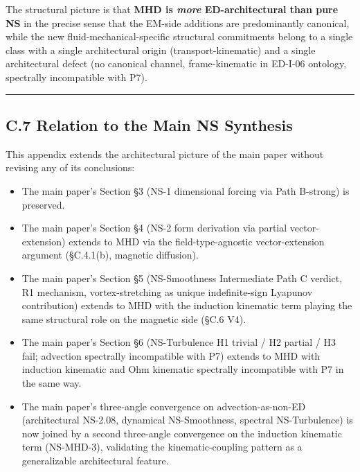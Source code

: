 \documentclass[
  11pt,a4paper]{article}
\providecommand{\tightlist}{%
  \setlength{\itemsep}{0pt}\setlength{\parskip}{0pt}}
\begin{document}
The structural picture is that \textbf{MHD is \emph{more}
ED-architectural than pure NS} in the precise sense that the EM-side
additions are predominantly canonical, while the new
fluid-mechanical-specific structural commitments belong to a single
class with a single architectural origin (transport-kinematic) and a
single architectural defect (no canonical channel, frame-kinematic in
ED-I-06 ontology, spectrally incompatible with P7).

\begin{center}\rule{0.5\linewidth}{0.5pt}\end{center}

\subsection{C.7 Relation to the Main NS
Synthesis}\label{c.7-relation-to-the-main-ns-synthesis}

This appendix extends the architectural picture of the main paper
without revising any of its conclusions:

\begin{itemize}
\tightlist
\item
  The main paper's Section §3 (NS-1 dimensional forcing via Path
  B-strong) is preserved.
\item
  The main paper's Section §4 (NS-2 form derivation via partial
  vector-extension) extends to MHD via the field-type-agnostic
  vector-extension argument (§C.4.1(b), magnetic diffusion).
\item
  The main paper's Section §5 (NS-Smoothness Intermediate Path C
  verdict, R1 mechanism, vortex-stretching as unique indefinite-sign
  Lyapunov contribution) extends to MHD with the induction kinematic
  term playing the same structural role on the magnetic side (§C.6 V4).
\item
  The main paper's Section §6 (NS-Turbulence H1 trivial / H2 partial /
  H3 fail; advection spectrally incompatible with P7) extends to MHD
  with induction kinematic and Ohm kinematic spectrally incompatible
  with P7 in the same way.
\item
  The main paper's three-angle convergence on advection-as-non-ED
  (architectural NS-2.08, dynamical NS-Smoothness, spectral
  NS-Turbulence) is now joined by a second three-angle convergence on
  the induction kinematic term (NS-MHD-3), validating the
  kinematic-coupling pattern as a generalizable architectural feature.
\end{itemize}
\end{document}
